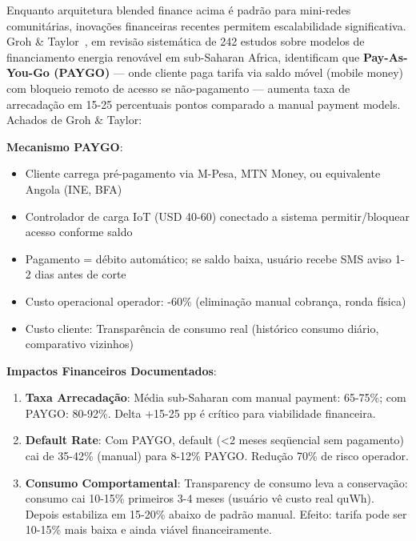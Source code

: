 \documentclass[12pt, a4paper]{article}
\begin{document}
Enquanto arquitetura blended finance acima é padrão para mini-redes comunitárias, inovações financeiras recentes permitem escalabilidade significativa. Groh \& Taylor~\citep{Groh2015}, em revisão sistemática de 242 estudos sobre modelos de financiamento energia renovável em sub-Saharan Africa, identificam que \textbf{Pay-As-You-Go (PAYGO)} — onde cliente paga tarifa via saldo móvel (mobile money) com bloqueio remoto de acesso se não-pagamento — aumenta taxa de arrecadação em 15-25 percentuais pontos comparado a manual payment models. Achados de Groh \& Taylor:

\textbf{Mecanismo PAYGO}:
\begin{itemize}
\item Cliente carrega pré-pagamento via M-Pesa, MTN Money, ou equivalente Angola (INE, BFA)
\item Controlador de carga IoT (USD 40-60) conectado a sistema permitir/bloquear acesso conforme saldo
\item Pagamento = débito automático; se saldo baixa, usuário recebe SMS aviso 1-2 dias antes de corte
\item Custo operacional operador: -60\% (eliminação manual cobrança, ronda física)
\item Custo cliente: Transparência de consumo real (histórico consumo diário, comparativo vizinhos)
\end{itemize}

\textbf{Impactos Financeiros Documentados}:
\begin{enumerate}
\item \textbf{Taxa Arrecadação}: Média sub-Saharan com manual payment: 65-75\%; com PAYGO: 80-92\%. Delta +15-25 pp é crítico para viabilidade financeira.
\item \textbf{Default Rate}: Com PAYGO, default (<2 meses seqüencial sem pagamento) cai de 35-42\% (manual) para 8-12\% PAYGO. Redução 70\% de risco operador.
\item \textbf{Consumo Comportamental}: Transparency de consumo leva a conservação: consumo cai 10-15\% primeiros 3-4 meses (usuário vê custo real quWh). Depois estabiliza em 15-20\% abaixo de padrão manual. Efeito: tarifa pode ser 10-15\% mais baixa e ainda viável financeiramente.
\end{enumerate}
\end{document}
